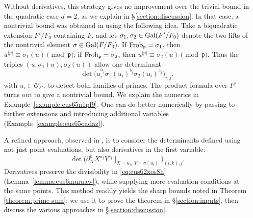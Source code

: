 \documentclass[reqno]{amsart} 
\begin{document}
Without derivatives, this strategy gives no improvement over the trivial bound in the quadratic case $d=2$, as we explain in \S\ref{section:discussion}.  In that case, a nontrivial bound was obtained in \cite{OAI:Uniform-exclusion-of-Landau-Siegel-zeros-October-1-2026} using the following idea.  Take a biquadratic extension $F'/F_0$ containing $F$, and let $\sigma_1,\sigma_2\in\operatorname{Gal}(F'/F_0)$ denote the two lifts of the nontrivial element $\sigma\in\operatorname{Gal}(F/F_0)$.  If $\operatorname{Frob}_{\mathfrak{p}}=\sigma_1$, then $u^{|p|}\equiv\sigma_1(u)\pmod{\mathfrak{p}}$; if $\operatorname{Frob}_{\mathfrak{p}}=\sigma_2$, then $u^{|p|}\equiv\sigma_2(u)\pmod{\mathfrak{p}}$.  Thus the triples $(u,\sigma_1(u),\sigma_2(u))$ allow one determinant
\begin{equation}\label{eq:cus6424wkg}
  \det \bigl( u_i^{a_j} \sigma_1(u_i)^{b_j} \sigma_2(u_i)^{c_j} \bigr)_{i, j},
\end{equation}
with $u_i\in\mathcal{O}_{F'}$, to detect both families of primes.  The product formula over $F'$ turns out to give a nontrivial bound.  We explain the numerics in Example~\ref{example:cus65n1pf9}.  One can do better numerically by passing to further extensions and introducing additional variables (Example~\ref{example:cus65oadaz}).

A refined approach, observed in \cite{hexagon:2610.00311v2}, is to consider the determinants defined using not just point evaluations, but also derivatives in the first variable:
\begin{equation}\label{eq:cus646c6bn}
  \det \bigl( \partial_X^k X^{a_j} Y^{b_j} \mid_{X = u_i, \, Y = \sigma(u_i)}\bigr)_{(i, k), j}.
\end{equation}
Derivatives preserve the divisibility in \eqref{eq:cus62xos8h} (Lemma~\ref{lemma:cus6muraaw}), while supplying more evaluation conditions at the same points.  This method readily yields the sharp bounds noted in Theorem \ref{theorem:prime-sum}; we use it to prove the theorem in \S\ref{section:inputs}, then discuss the various approaches in \S\ref{section:discussion}.
\end{document}
